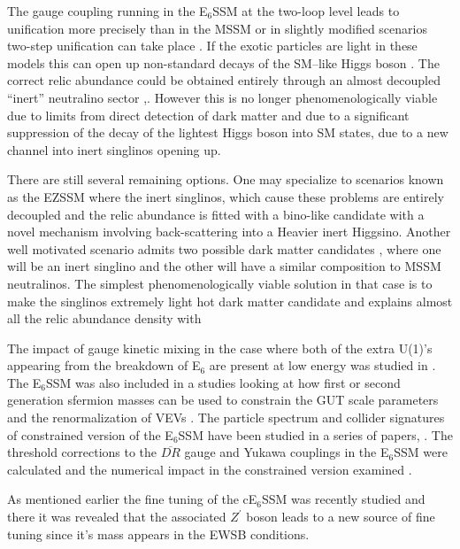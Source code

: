 \documentclass[preprint,amsmath,amssymb,aps,superscriptaddress,prd,showpacs,floatfix]{revtex4-1}
\begin{document}
The gauge coupling running in the E$_6$SSM at the two-loop level leads
to unification more precisely than in the MSSM \cite{King:2007uj} or
in slightly modified scenarios two-step unification can take place
\cite{Howl:2007hq,Howl:2007zi}. If the exotic particles are light in
these models this can open up non-standard decays of the SM--like
Higgs boson \cite{Hall:2010ix,Nevzorov:2013tta,Athron:2014pua}. The
correct relic abundance could be obtained entirely through an almost
decoupled ``inert'' neutralino sector \cite{Hall:2009aj},.  However
this is no longer phenomenologically viable due to limits from
direct detection of dark matter
\cite{2011PhRvL.107m1302A,2012PhRvL.109r1301A, Akerib:2013tjd} and due
to a significant suppression of the decay of the lightest Higgs boson
into SM states, due to a new channel into inert singlinos opening up.

There are still several remaining options. One may specialize to
scenarios known as the EZSSM \cite{Hall:2011zq} where the inert
singlinos, which cause these problems are entirely decoupled and the
relic abundance is fitted with a bino-like candidate with a novel
mechanism involving back-scattering into a Heavier inert
Higgsino. Another well motivated scenario admits two possible dark
matter candidates \cite{Nevzorov:2012hs}, where one will be an inert
singlino and the other will have a similar composition to MSSM
neutralinos. The simplest phenomenologically viable solution in that
case is to make the singlinos extremely light hot dark matter
candidate and explains almost all the relic abundance density with

The impact of gauge kinetic
mixing in the case where both of the extra U(1)'s appearing from the
breakdown of E$_6$ are present at low energy was studied in
\cite{Rizzo:2012rf}.  The E$_6$SSM was also included in a studies looking
at how first or second generation sfermion masses can be used to
constrain the GUT scale parameters \cite{Miller:2012vn} and the
renormalization of VEVs \cite{Sperling:2013eva, Sperling:2013xqa}.
The particle spectrum and  collider signatures of constrained version of the E$_6$SSM have been studied in a series of papers,
\cite{Athron:2009ue,Athron:2009bs,Athron:2011wu,Athron:2012sq}. The threshold
corrections to the $\overline{DR}$ gauge and Yukawa couplings in the
E$_6$SSM were calculated and the numerical impact in the constrained
version examined \cite{Athron:2012pw}. 

As mentioned earlier the fine tuning of the cE$_6$SSM was recently studied
\cite{Athron:2013ipa} and there it was revealed that the associated
$Z^\prime$ boson leads to a new source of fine tuning since it's mass
appears in the EWSB conditions.  
\end{document}

